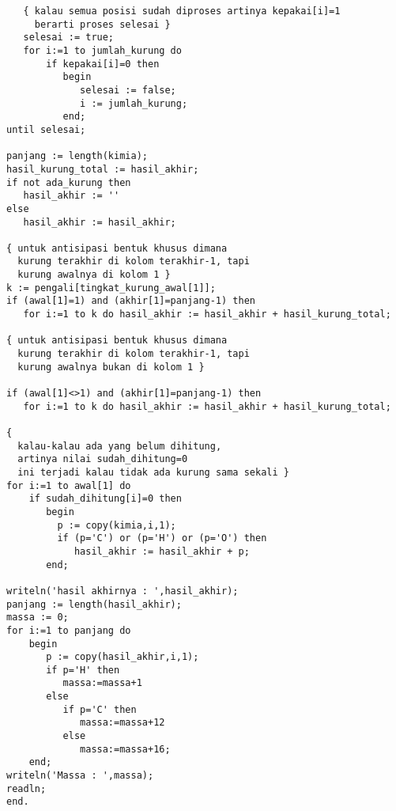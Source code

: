 \documentclass[a4paper,10pt,makeidx]{article}
\begin{document}
\begin{verbatim}
   { kalau semua posisi sudah diproses artinya kepakai[i]=1
     berarti proses selesai }
   selesai := true;
   for i:=1 to jumlah_kurung do
       if kepakai[i]=0 then
          begin
             selesai := false;
             i := jumlah_kurung;
          end;
until selesai;

panjang := length(kimia);
hasil_kurung_total := hasil_akhir;
if not ada_kurung then
   hasil_akhir := ''
else
   hasil_akhir := hasil_akhir;

{ untuk antisipasi bentuk khusus dimana
  kurung terakhir di kolom terakhir-1, tapi
  kurung awalnya di kolom 1 }
k := pengali[tingkat_kurung_awal[1]];
if (awal[1]=1) and (akhir[1]=panjang-1) then
   for i:=1 to k do hasil_akhir := hasil_akhir + hasil_kurung_total;

{ untuk antisipasi bentuk khusus dimana
  kurung terakhir di kolom terakhir-1, tapi
  kurung awalnya bukan di kolom 1 }

if (awal[1]<>1) and (akhir[1]=panjang-1) then
   for i:=1 to k do hasil_akhir := hasil_akhir + hasil_kurung_total;

{
  kalau-kalau ada yang belum dihitung,
  artinya nilai sudah_dihitung=0
  ini terjadi kalau tidak ada kurung sama sekali }
for i:=1 to awal[1] do
    if sudah_dihitung[i]=0 then
       begin
         p := copy(kimia,i,1);
         if (p='C') or (p='H') or (p='O') then
            hasil_akhir := hasil_akhir + p;
       end;

writeln('hasil akhirnya : ',hasil_akhir);
panjang := length(hasil_akhir);
massa := 0;
for i:=1 to panjang do
    begin
       p := copy(hasil_akhir,i,1);
       if p='H' then
          massa:=massa+1
       else
          if p='C' then
             massa:=massa+12
          else
             massa:=massa+16;
    end;
writeln('Massa : ',massa);
readln;
end.
\end{verbatim}
\end{document}
